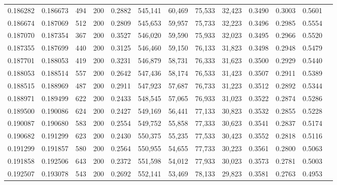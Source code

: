 \begin{tabular}{rrrrrrrrrrrrr}
0.186282 & 0.186673 &    494 & 200 &                                     0.2882 & 545,141 &  60,469 &  75,533 &  32,423 & 0.3490 & 0.3003 & 0.5601 \\
0.186674 & 0.187069 &    512 & 200 &                                     0.2809 & 545,653 &  59,957 &  75,733 &  32,223 & 0.3496 & 0.2985 & 0.5554 \\
0.187070 & 0.187354 &    367 & 200 &                                     0.3527 & 546,020 &  59,590 &  75,933 &  32,023 & 0.3495 & 0.2966 & 0.5520 \\
0.187355 & 0.187699 &    440 & 200 &                                     0.3125 & 546,460 &  59,150 &  76,133 &  31,823 & 0.3498 & 0.2948 & 0.5479 \\
0.187701 & 0.188053 &    419 & 200 &                                     0.3231 & 546,879 &  58,731 &  76,333 &  31,623 & 0.3500 & 0.2929 & 0.5440 \\
0.188053 & 0.188514 &    557 & 200 &                                     0.2642 & 547,436 &  58,174 &  76,533 &  31,423 & 0.3507 & 0.2911 & 0.5389 \\
0.188515 & 0.188969 &    487 & 200 &                                     0.2911 & 547,923 &  57,687 &  76,733 &  31,223 & 0.3512 & 0.2892 & 0.5344 \\
0.188971 & 0.189499 &    622 & 200 &                                     0.2433 & 548,545 &  57,065 &  76,933 &  31,023 & 0.3522 & 0.2874 & 0.5286 \\
0.189500 & 0.190086 &    624 & 200 &                                     0.2427 & 549,169 &  56,441 &  77,133 &  30,823 & 0.3532 & 0.2855 & 0.5228 \\
0.190087 & 0.190680 &    583 & 200 &                                     0.2554 & 549,752 &  55,858 &  77,333 &  30,623 & 0.3541 & 0.2837 & 0.5174 \\
0.190682 & 0.191299 &    623 & 200 &                                     0.2430 & 550,375 &  55,235 &  77,533 &  30,423 & 0.3552 & 0.2818 & 0.5116 \\
0.191299 & 0.191857 &    580 & 200 &                                     0.2564 & 550,955 &  54,655 &  77,733 &  30,223 & 0.3561 & 0.2800 & 0.5063 \\
0.191858 & 0.192506 &    643 & 200 &                                     0.2372 & 551,598 &  54,012 &  77,933 &  30,023 & 0.3573 & 0.2781 & 0.5003 \\
0.192507 & 0.193078 &    543 & 200 &                                     0.2692 & 552,141 &  53,469 &  78,133 &  29,823 & 0.3581 & 0.2763 & 0.4953 \\

\end{tabular}
